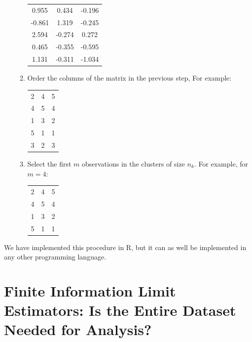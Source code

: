 \documentclass[11pt,a5paper,twoside]{book}
\begin{document}
\begin{enumerate}
\begin{enumerate}
\begin{center}
		\begin{tabular}{ccc}
			 0.955 & 0.434 & -0.196 \\ 
			 -0.861 & 1.319 & -0.245 \\ 
			 2.594 & -0.274 & 0.272 \\ 
			 0.465 & -0.355 & -0.595 \\ 
			 1.131 & -0.311 & -1.034 
		\end{tabular}
	\end{center}
		\item Order the columns of the matrix in the previous step, For example:
		\begin{center}
		\begin{tabular}{ccc}
	   2 &   4 &   5 \\ 
	   4 &   5 &   4 \\ 
	   1 &   3 &   2 \\ 
	   5 &   1 &   1 \\ 
	   3 &   2 &   3 
		\end{tabular}
	\end{center}	
	\item 	Select the first $m$ observations in the clusters of size $n_k$. For example, for $m=4$:
		\begin{center}
		\begin{tabular}{ccc}
			2 &   4 &   5 \\ 
			4 &   5 &   4 \\ 
			1 &   3 &   2 \\ 
			5 &   1 &   1 
		\end{tabular}
	\end{center}	
	\end{enumerate}
\end{enumerate}

We have implemented this procedure in R, but it can as well be implemented in any other programming language.


\section[Finite Information Limit Estimators]{Finite Information Limit Estimators: Is the Entire Dataset Needed for Analysis?}
\end{document}
